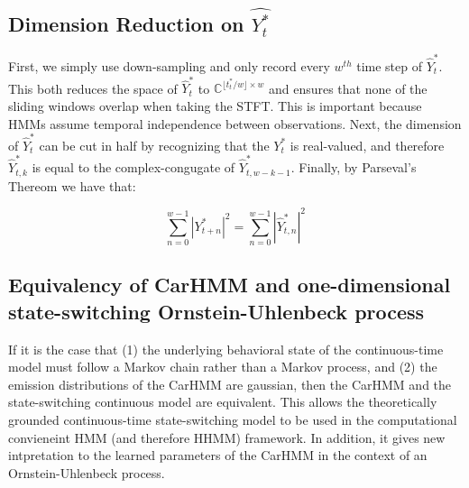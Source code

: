 
\iffalse


\subsection{Dimension Reduction on $\hat{Y_t^*}$}

First, we simply use down-sampling and only record every $w^{th}$ time step of $\hat{Y}_t^*$. This both reduces the space of $\hat{Y}_t^*$ to $\mathbb{C}^{\lfloor t^*_t / w \rfloor \times w}$ and ensures that none of the sliding windows overlap when taking the STFT. This is important because HMMs assume temporal independence between observations. Next, the dimension of $\hat{Y}_t^*$ can be cut in half by recognizing that the $Y_t^*$ is real-valued, and therefore $\hat{Y}_{t,k}^*$ is equal to the complex-congugate of $\hat{Y}_{t,w-k-1}^*$. Finally, by Parseval's Thereom we have that:

$$\sum_{n = 0}^{w-1} |Y^*_{t+n}|^2 = \sum_{n = 0}^{w-1} |\hat{Y}^*_{t,n}|^2$$

\subsection{Equivalency of CarHMM and one-dimensional state-switching Ornstein-Uhlenbeck process}

If it is the case that (1) the underlying behavioral state of the continuous-time model must follow a Markov chain rather than a Markov process, and (2) the emission distributions of the CarHMM are gaussian, then the CarHMM and the state-switching continuous model are equivalent. This allows the theoretically grounded continuous-time state-switching model to be used in the computational convieneint HMM (and therefore HHMM) framework. In addition, it gives new intpretation to the learned parameters of the CarHMM in the context of an Ornstein-Uhlenbeck process.

